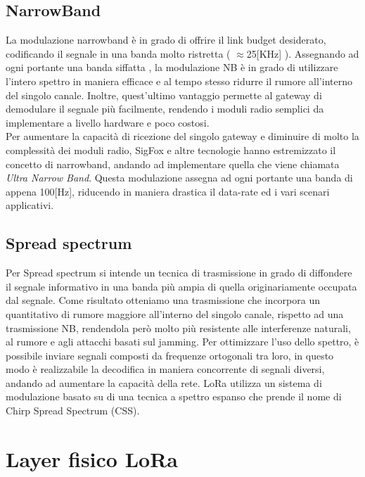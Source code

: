 \subsection{NarrowBand}
La modulazione narrowband è in grado di offrire il link budget desiderato,
codificando il segnale in una banda molto ristretta ( $\approx$25[KHz]
).  Assegnando ad ogni  portante una banda siffatta , la modulazione NB è in
grado di utilizzare l'intero spettro in maniera efficace e al tempo stesso 
ridurre il rumore all'interno del singolo canale. Inoltre, quest'ultimo 
vantaggio permette al gateway di demodulare il segnale più facilmente, rendendo
i moduli radio semplici da implementare a livello hardware e poco costosi.\\
Per aumentare la capacità di ricezione
del  singolo gateway  e diminuire di molto la  complessità dei moduli radio,
SigFox e altre tecnologie hanno estremizzato il concetto di narrowband, andando ad
implementare quella che viene chiamata \emph{Ultra Narrow Band}.
Questa modulazione assegna ad ogni portante una banda di appena 100[Hz],
riducendo in maniera drastica il data-rate ed  i vari scenari applicativi. 

\subsection{Spread spectrum} 
Per  Spread spectrum si intende un tecnica di trasmissione
in grado di diffondere il segnale informativo in una banda più ampia di quella
originariamente occupata dal segnale. Come risultato otteniamo una trasmissione 
che incorpora un quantitativo di  rumore maggiore all'interno del singolo
canale, rispetto ad una trasmissione NB,
rendendola però molto più resistente alle interferenze
naturali, al rumore e agli attacchi basati sul jamming.
Per ottimizzare l'uso dello spettro, è possibile inviare segnali composti da  
frequenze ortogonali tra loro, in questo modo è realizzabile la decodifica in maniera
concorrente di segnali diversi, andando ad aumentare la capacità della rete.
LoRa utilizza un sistema di modulazione basato su di una tecnica  a 
spettro espanso che prende il nome di Chirp Spread Spectrum (CSS).
\section{Layer fisico LoRa}
